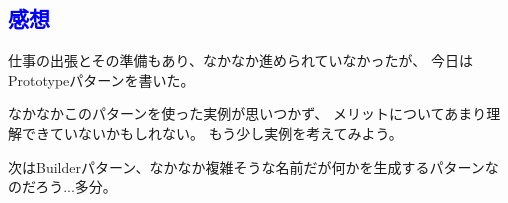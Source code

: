\documentclass[11pt]{jsarticle}
\begin{document}
		\subsection*{\textcolor{blue}{感想}}
			仕事の出張とその準備もあり、なかなか進められていなかったが、
			今日はPrototypeパターンを書いた。
			
			なかなかこのパターンを使った実例が思いつかず、
			メリットについてあまり理解できていないかもしれない。
			もう少し実例を考えてみよう。
			
			次はBuilderパターン、なかなか複雑そうな名前だが何かを生成するパターンなのだろう...多分。
			\clearpage		
			
			
			
			
			
			
			
			
			
			
			
			
			
			
			
			
			
			
			
			
			
			
			
			
			
		
\end{document}

